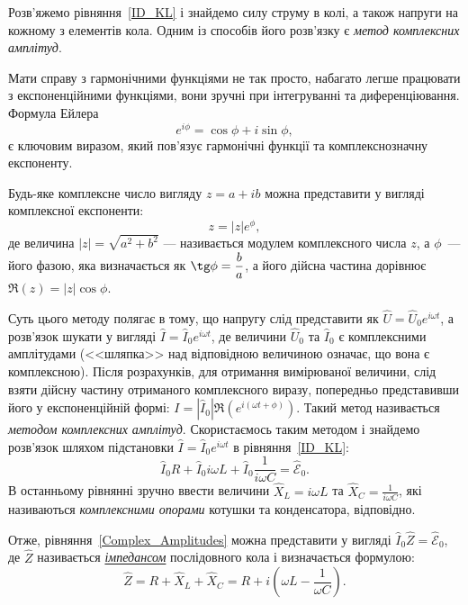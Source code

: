 \documentclass[]{LabWork}
\begin{document}
Розв'яжемо рівняння~\eqref{ID_KL} і знайдемо силу струму в колі, а також напруги на кожному з елементів кола. Одним із способів його розв'язку є \emph{метод комплексних амплітуд}.

\noindent\bigskip%
\begin{More}
	Мати справу з гармонічними функціями не так просто, набагато легше працювати з експоненційними функціями, вони зручні при інтегруванні та диференціювання. Формула Ейлера
	\begin{equation*}
		e^{i\phi} = \cos\phi + i\sin\phi,
	\end{equation*}
	є ключовим виразом, який пов'язує гармонічні функції та комплекснозначну експоненту.

	Будь-яке комплексне число вигляду $z = a + ib$ можна представити у вигляді комплексної експоненти:
	\[
		z = |z|e^{\phi},
	\]
	де величина $|z| = \sqrt{a^2 + b^2}$ --- називається модулем комплексного числа $z$, а $\phi$~--- його фазою, яка визначається як $\tg\phi = \dfrac{b}{a}$, а його дійсна частина дорівнює $\Re{(z)} =|z|\cos\phi$.
\end{More}


Суть цього методу полягає в тому, що напругу слід представити як $\hat{U} = \hat{U}_0e^{i\omega t}$, а розв'язок шукати у вигляді $\hat{I} = \hat{I}_0e^{i\omega t}$, де величини $\hat{U}_0$  та $\hat{I}_0$ є комплексними амплітудами (<<шляпка>> над відповідною величиною означає, що вона є комплексною). Після розрахунків, для отримання вимірюваної величини, слід взяти дійсну частину отриманого комплексного виразу, попередньо представивши його у експоненційній формі: $I = |\hat{I}_0| \Re(e^{i(\omega t + \phi)})$. Такий метод називається \emph{методом комплексних амплітуд}. Скористаємось таким методом  і знайдемо розв'язок  шляхом підстановки $\hat{I} = \hat{I}_0e^{i\omega t}$ в рівняння~\eqref{ID_KL}:
\begin{equation}\label{Complex_Amplitudes}
	\hat{I}_0 R  + \hat{I}_0 i\omega L + \hat{I}_0 \frac{1}{i\omega C} = \hat{\mathcal{E}}_0.
\end{equation}
В останньому рівнянні зручно ввести величини $\hat{X}_L = i\omega L$ та $\hat{X}_C = \frac{1}{i\omega C}$, які називаються \emph{комплексними опорами} котушки та конденсатора, відповідно.

Отже, рівняння~\eqref{Complex_Amplitudes} можна представити у вигляді  $\hat{I}_0 \hat{Z} = \hat{\mathcal{E}}_0$, де $\hat{Z}$ називається \href{http://femto.com.ua/articles/part_1/1313.html}{\emph{імпедансом}} послідовного кола і визначається формулою:
\begin{equation}\label{total_impedance}
	\hat{Z} = R + \hat{X}_L + \hat{X}_C = R  +   i\left(  \omega L - \frac{1}{\omega C} \right) .
\end{equation}
\end{document}
